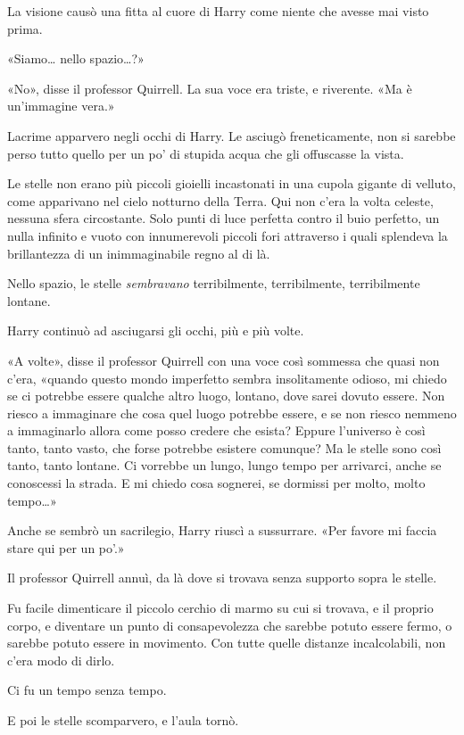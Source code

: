 La visione causò una fitta al cuore di Harry come niente che avesse mai visto prima.

«Siamo… nello spazio…?»

«No», disse il professor Quirrell. La sua voce era triste, e riverente. «Ma è un’immagine vera.»

Lacrime apparvero negli occhi di Harry. Le asciugò freneticamente, non si sarebbe perso tutto quello per un po’ di stupida acqua che gli offuscasse la vista.

Le stelle non erano più piccoli gioielli incastonati in una cupola gigante di velluto, come apparivano nel cielo notturno della Terra. Qui non c’era la volta celeste, nessuna sfera circostante. Solo punti di luce perfetta contro il buio perfetto, un nulla infinito e vuoto con innumerevoli piccoli fori attraverso i quali splendeva la brillantezza di un inimmaginabile regno al di là.

Nello spazio, le stelle \textit{sembravano} terribilmente, terribilmente, terribilmente lontane.

Harry continuò ad asciugarsi gli occhi, più e più volte.

«A volte», disse il professor Quirrell con una voce così sommessa che quasi non c’era, «quando questo mondo imperfetto sembra insolitamente odioso, mi chiedo se ci potrebbe essere qualche altro luogo, lontano, dove sarei dovuto essere. Non riesco a immaginare che cosa quel luogo potrebbe essere, e se non riesco nemmeno a immaginarlo allora come posso credere che esista? Eppure l’universo è così tanto, tanto vasto, che forse potrebbe esistere comunque? Ma le stelle sono così tanto, tanto lontane. Ci vorrebbe un lungo, lungo tempo per arrivarci, anche se conoscessi la strada. E mi chiedo cosa sognerei, se dormissi per molto, molto tempo…»

Anche se sembrò un sacrilegio, Harry riuscì a sussurrare. «Per favore mi faccia stare qui per un po’.»

Il professor Quirrell annuì, da là dove si trovava senza supporto sopra le stelle.

Fu facile dimenticare il piccolo cerchio di marmo su cui si trovava, e il proprio corpo, e diventare un punto di consapevolezza che sarebbe potuto essere fermo, o sarebbe potuto essere in movimento. Con tutte quelle distanze incalcolabili, non c’era modo di dirlo.

Ci fu un tempo senza tempo.

E poi le stelle scomparvero, e l’aula tornò.

